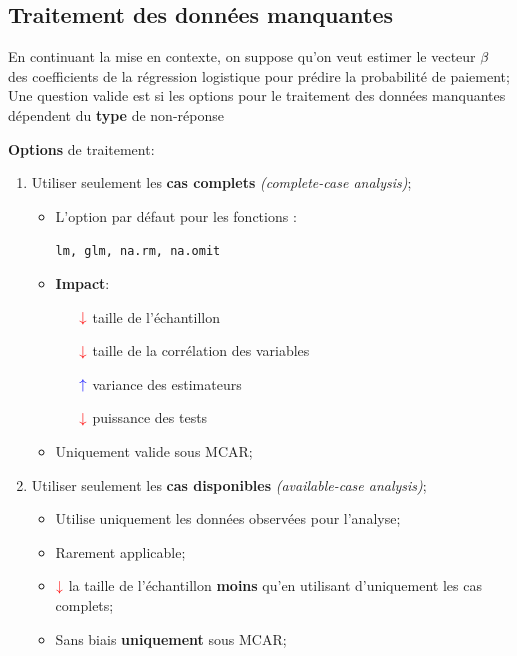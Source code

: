 \documentclass[10pt, french]{article}
\begin{document}
\begin{multicols*}{3}
\subsection*{Traitement des données manquantes}

En continuant la mise en contexte, on suppose qu'on veut estimer le vecteur $\mathbf{\beta}$ des coefficients de la régression logistique pour prédire la probabilité de paiement;
Une question valide est si les options pour le traitement des données manquantes dépendent du \textbf{type} de non-réponse

\textbf{Options} de traitement:
\begin{enumerate}
	\item	Utiliser seulement les \textbf{cas complets} \textit{(complete-case analysis)};
		\begin{itemize}
		\item	L'option par défaut pour les fonctions :
			\begin{center}
			\texttt{lm, glm, na.rm, na.omit}
			\end{center}
		\item	\textbf{Impact}:
			\begin{itemize}
			\item[$\color{red}\downarrow$]	taille de l'échantillon	\\
			\item[$\color{red}\downarrow$]	taille de la corrélation des variables	\\
			\item[$\color{blue}\uparrow$]	variance des estimateurs	\\
			\item[$\color{red}\downarrow$]	puissance des tests	\\
			\end{itemize}
		\item	Uniquement valide sous \textcolor{ao(english)}{MCAR};
		\end{itemize}
	\item	Utiliser seulement les \textbf{cas disponibles} \textit{(available-case analysis)};
		\begin{itemize}
		\item	Utilise uniquement les données observées pour l'analyse;
		\item	Rarement applicable;
		\item	$\color{red}\downarrow$ la taille de l'échantillon \textbf{moins} qu'en utilisant d'uniquement les cas complets;
		\item	\textcolor{ao(english)}{Sans biais} \textbf{uniquement} sous \textcolor{ao(english)}{MCAR};

\end{itemize}
\end{enumerate}
\end{multicols*}
\end{document}
